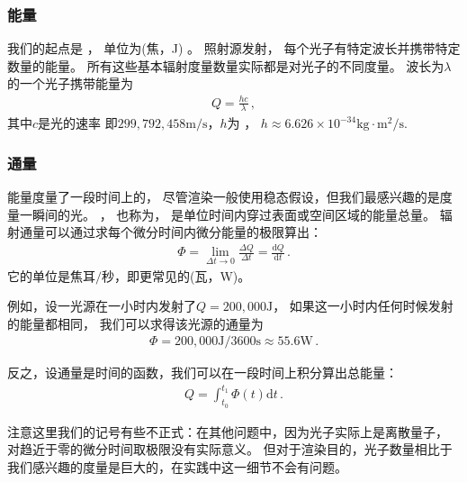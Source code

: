 \subsubsection*{能量}
我们的起点是
，
单位为(焦，J)
。
照射源发射，
每个光子有特定波长并携带特定数量的能量。
所有这些基本辐射度量数量实际都是对光子的不同度量。
波长为$\lambda$的一个光子携带能量为
\begin{align*}
    Q=\frac{hc}{\lambda}\, ,
\end{align*}
其中$c$是光的速率
即$299,792,458\text{m}/\text{s}$，$h$为
，
$h\approx6.626\times10^{-34}\text{kg}\cdot\text{m}^2/\text{s}$.

\subsubsection*{通量}
能量度量了一段时间上的，
尽管渲染一般使用稳态假设，但我们最感兴趣的是度量一瞬间的光。
，
也称为，
是单位时间内穿过表面或空间区域的能量总量。
辐射通量可以通过求每个微分时间内微分能量的极限算出：
\begin{align*}
    \varPhi=\lim\limits_{\Delta t\rightarrow 0}{\frac{\Delta Q}{\Delta t}}=\frac{\mathrm{d}Q}{\mathrm{d}t}\, .
\end{align*}
它的单位是焦耳$/$秒，即更常见的(瓦，W)。

例如，设一光源在一小时内发射了$Q=200,000\text{J}$，
如果这一小时内任何时候发射的能量都相同，
我们可以求得该光源的通量为
\begin{align*}
    \varPhi=200,000\text{J}/3600\text{s}\approx 55.6\text{W}\, .
\end{align*}

反之，设通量是时间的函数，我们可以在一段时间上积分算出总能量：
\begin{align*}
    Q=\int_{t_0}^{t_1}\varPhi(t)\mathrm{d}t\, .
\end{align*}

注意这里我们的记号有些不正式：在其他问题中，因为光子实际上是离散量子，
对趋近于零的微分时间取极限没有实际意义。
但对于渲染目的，光子数量相比于我们感兴趣的度量是巨大的，在实践中这一细节不会有问题。

